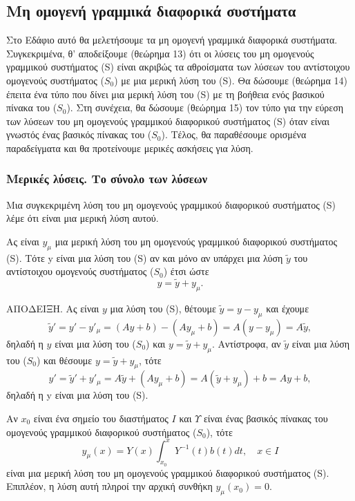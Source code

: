 \documentclass[11pt,a4paper,twoside]{book}
\newcommand{\titlefont}[1]{{\fontfamily{maksf}\selectfont #1}}
\newcounter{thewrhma}[chapter]
\renewcommand{\thethewrhma}{\thechapter.\arabic{thewrhma}}
\newcommand{\thewr}{\refstepcounter{thewrhma}{\bf\titlefont{\textcolor{secondarycolor}{\large Θεώρημα\hspace{2mm}\thethewrhma}}}\hspace{1mm}}{}
\newenvironment{Thewrhma}[1]
{\begin{tcolorbox}[title=\thewr\ \ :\ \  {\textcolor{black}{\bf{\large\titlefont{#1}}}},
breakable,
enhanced standard,
titlerule=-.2pt,
toprule=0pt, 
rightrule=0pt, 
bottomrule=0pt,
colback=white,
left=2mm,
top=1mm,
bottom=0mm,
boxrule=0pt,
colframe=white,
borderline west={1.5mm}{0pt}{secondarycolor},
leftrule=2mm,
sharp corners,
coltitle=secondarycolor]}
{\end{tcolorbox}}
\begin{document}
\subsection{Μη ομογενή γραμμικά διαφορικά συστήματα}

Στο Εδάφιο αυτό θα μελετήσουμε τα μη ομογενή γραμμικά διαφορικά συστήματα. Συγκεκριμένα, θ' αποδείξουμε (θεώρημα 13) ότι οι λύσεις του μη ομογενούς γραμμικού συστήματος (S) είναι ακριβώς τα αθροίσματα των λύσεων του αντίστοιχου ομογενούς συστήματος ($S_0$) με μια μερική λύση του (S). Θα δώσουμε (θεώρημα 14) έπειτα ένα τύπο που δίνει μια μερική λύση του (S) με τη βοήθεια ενός βασικού πίνακα του ($S_0$). Στη συνέχεια, θα δώσουμε (θεώρημα 15) τον τύπο για την εύρεση των λύσεων του μη ομογενούς γραμμικού διαφορικού συστήματος (S) όταν είναι γνωστός ένας βασικός πίνακας του ($S_0$). Τέλος, θα παραθέσουμε ορισμένα παραδείγματα και θα προτείνουμε μερικές ασκήσεις για λύση.

\subsubsection{Μερικές λύσεις. Το σύνολο των λύσεων}

Μια συγκεκριμένη λύση του μη ομογενούς γραμμικού διαφορικού συστήματος (S) λέμε ότι είναι μια μερική λύση αυτού.

\begin{Thewrhma}{13}
Ας είναι $y_{\mu}$ μια μερική λύση του μη ομογενούς γραμμικού διαφορικού συστήματος (S). Τότε y είναι μια λύση του (S) αν και μόνο αν υπάρχει μια λύση $\tilde{y}$ του αντίστοιχου ομογενούς συστήματος ($S_0$) έτσι ώστε
\[
y = \tilde{y} + y_{\mu}.
\]
\end{Thewrhma}
ΑΠΟΔΕΙΞΗ. Ας είναι $y$ μια λύση του (S), θέτουμε $\tilde{y}=y-y_{\mu}$ και έχουμε
\[
\tilde{y}' = y' - y'_{\mu} = (Ay+b) - (Ay_{\mu}+b) = A(y-y_{\mu}) = A\tilde{y},
\]
δηλαδή η $y$ είναι μια λύση του ($S_0$) και $y = \tilde{y} + y_{\mu}$. Αντίστροφα, αν $\tilde{y}$ είναι μια λύση του ($S_0$) και θέσουμε $y = \tilde{y} + y_{\mu}$, τότε
\[
y' = \tilde{y}' + y'_{\mu} = A\tilde{y} + (Ay_{\mu}+b) = A(\tilde{y}+y_{\mu})+b = Ay+b,
\]
δηλαδή η y είναι μια λύση του (S).

\begin{Thewrhma}{14}
Αν $x_0$ είναι ένα σημείο του διαστήματος $Ι$ και $Υ$ είναι ένας βασικός πίνακας του ομογενούς γραμμικού διαφορικού συστήματος ($S_0$), τότε
\[
y_{\mu}(x) = Y(x) \int_{x_0}^{x} Y^{-1}(t)b(t)dt, \quad x \in I
\]
είναι μια μερική λύση του μη ομογενούς γραμμικού διαφορικού συστήματος (S). Επιπλέον, η λύση αυτή πληροί την αρχική συνθήκη $y_{\mu}(x_0)=0$.
\end{Thewrhma}
\end{document}
